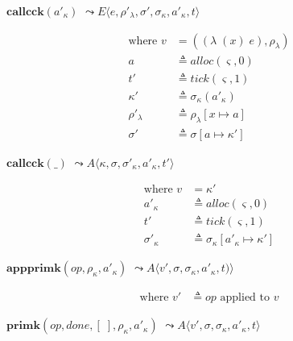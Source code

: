 \documentclass[12pt,draft]{article}
\newcommand{\singlelamsyn}[2]{(\lambda\;(#1)\;#2)}
\begin{document}
\begin{multicols*}{2}
\begin{center}
  $\textbf{callcck}(a'_\kappa)$
  $\leadsto E\langle e , \rho'_\lambda , \sigma' , \sigma_\kappa , a'_\kappa , t \rangle$
\end{center}
\vspace{-7mm}
\begin{align*}
  \text{where } v &= (\singlelamsyn{x}{e} , \rho_{\lambda}) \\
  a &\triangleq alloc(\varsigma, 0) \\
  t' &\triangleq tick(\varsigma, 1) \\
  \kappa' &\triangleq \sigma_\kappa(a'_\kappa) \\
  \rho'_{\lambda} &\triangleq \rho_{\lambda}[x \mapsto a] \\
  \sigma' &\triangleq \sigma[a \mapsto \kappa']
\end{align*}
\begin{center}
  $\textbf{callcck}(\_)$
  $\leadsto A\langle \kappa , \sigma , \sigma'_\kappa , a'_\kappa  , t' \rangle$
\end{center}
\vspace{-7mm}
\begin{align*}
  \text{where }
  v &= \kappa' \\
  a'_\kappa &\triangleq alloc(\varsigma, 0) \\
  t' &\triangleq tick(\varsigma, 1) \\
  \sigma'_\kappa &\triangleq \sigma_\kappa[a'_\kappa \mapsto \kappa']
\end{align*}
\begin{center}
  $\textbf{appprimk}(op, \rho_\kappa, a'_\kappa)$
  $\leadsto A\langle v' , \sigma , \sigma_\kappa , a'_\kappa ,t) \rangle$
\end{center}
\vspace{-7mm}
\begin{align*}
\text{where } v' &\triangleq op \text{ applied to } v
\end{align*}
\begin{center}
  $\textbf{primk}(op, done, [\;], \rho_\kappa, a'_\kappa)$
  $\leadsto A\langle v' , \sigma , \sigma_\kappa , a'_\kappa , t \rangle$
\end{center}
\vspace{-7mm}
\begin{align*}

\end{align*}
\end{multicols*}
\end{document}
